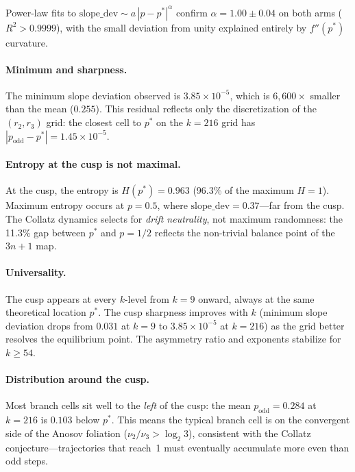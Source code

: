 \documentclass[11pt]{article}
\begin{document}
Power-law fits to $\mathrm{slope\_dev} \sim a\,|p - p^*|^\alpha$
confirm $\alpha = 1.00 \pm 0.04$ on both arms ($R^2 > 0.9999$),
with the small deviation from unity explained entirely by
$f''(p^*)$ curvature.

\paragraph{Minimum and sharpness.}
The minimum slope deviation observed is $3.85 \times 10^{-5}$, which
is $6{,}600\times$ smaller than the mean ($0.255$).  This residual
reflects only the discretization of the $(r_2, r_3)$ grid: the
closest cell to $p^*$ on the $k = 216$ grid has
$|p_{\mathrm{odd}} - p^*| = 1.45 \times 10^{-5}$.

\paragraph{Entropy at the cusp is not maximal.}
At the cusp, the entropy is $H(p^*) = 0.963$ (96.3\% of the
maximum $H = 1$).  Maximum entropy occurs at $p = 0.5$, where
$\mathrm{slope\_dev} = 0.37$---far from the cusp.  The Collatz
dynamics selects for \emph{drift neutrality}, not maximum randomness:
the 11.3\% gap between $p^*$ and $p = 1/2$ reflects the non-trivial
balance point of the $3n+1$ map.

\paragraph{Universality.}
The cusp appears at every $k$-level from $k = 9$ onward, always at
the same theoretical location $p^*$.  The cusp sharpness improves
with $k$ (minimum slope deviation drops from $0.031$ at $k = 9$
to $3.85 \times 10^{-5}$ at $k = 216$) as the grid better resolves
the equilibrium point.  The asymmetry ratio and exponents stabilize
for $k \ge 54$.

\paragraph{Distribution around the cusp.}
Most branch cells sit well to the \emph{left} of the cusp: the mean
$p_{\mathrm{odd}} = 0.284$ at $k = 216$ is $0.103$ below $p^*$.
This means the typical branch cell is on the convergent side of the
Anosov foliation ($\nu_2/\nu_3 > \log_2 3$), consistent with the
Collatz conjecture---trajectories that reach~1 must eventually
accumulate more even than odd steps.

\end{document}
